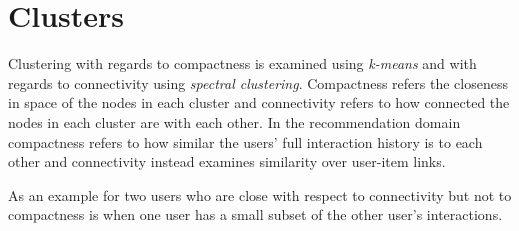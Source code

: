 
\section{Clusters}\label{sec:clusters}

Clustering with regards to compactness is examined using \textit{k-means} and with regards to connectivity using \textit{spectral clustering}. Compactness refers the closeness in space of the nodes in each cluster and connectivity refers to how connected the nodes in each cluster are with each other. In the recommendation domain compactness refers to how similar the users' full interaction history is to each other and connectivity instead examines similarity over user-item links.

As an example for two users who are close with respect to connectivity but not to compactness is when one user has a small subset of the other user's interactions.



\newpage


\newpage

